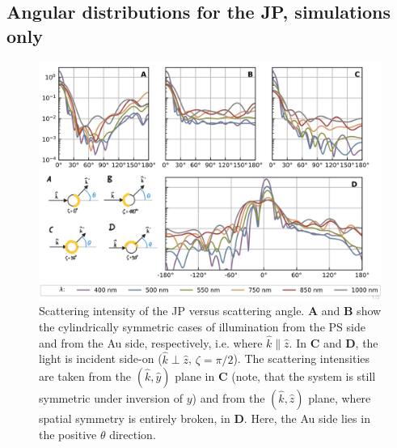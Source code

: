 \documentclass[10pt]{article}
\begin{document}
\subsection*{Angular distributions for the JP, simulations only}

\begin{figure}[h!]
    \centering
    \includegraphics[width=\textwidth]{[fig] cartesian mieplots (placeholder).jpg}
    \caption{Scattering intensity of the JP versus scattering angle. 
    {\sffamily\bfseries A} and {\sffamily\bfseries B} show the cylindrically symmetric cases of illumination from the PS side and from the Au side, respectively, i.e. where $\hat{k}\parallel\hat{z}$. 
    In {\sffamily\bfseries C} and {\sffamily\bfseries D}, the light is incident side-on ($\hat{k}\perp\hat{z}$, $\zeta=\pi/2$).
    The scattering intensities are taken from the $(\hat{k},\hat{y})$ plane in {\sffamily\bfseries C} (note, that the system is still symmetric under inversion of $y$) and from the $(\hat{k},\hat{z})$ plane, where spatial symmetry is entirely broken, in {\sffamily\bfseries D}.
    Here, the Au side lies in the positive $\theta$ direction.  
    }
    \label{fig:jp-mieplots}
\end{figure}
\end{document}
